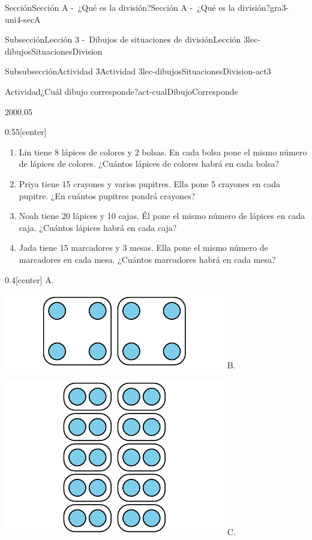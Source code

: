 \documentclass[twoside,10pt,]{article}
\begin{document}
\begin{sectionptx}{Sección}{Sección A -~¿Qué es la división?}{}{Sección A -~¿Qué es la división?}{}{}{gra3-uni4-secA}
\begin{subsectionptx}{Subsección}{Lección 3 -~Dibujos de situaciones de división}{}{Lección 3}{}{}{lec-dibujosSituacionesDivision}
\begin{subsubsectionptx}{Subsubsección}{Actividad 3}{}{Actividad 3}{}{}{lec-dibujosSituacionesDivision-act3}
\begin{activity}{Actividad}{¿Cuál dibujo corresponde?}{act-cualDibujoCorresponde}
\begin{sidebyside}{2}{0}{0}{0.05}
\begin{sbspanel}{0.55}[center]
\begin{enumerate}
\item{}Lin tiene 8 lápices de colores y 2 bolsas. En cada bolsa pone el mismo número de lápices de colores. ¿Cuántos lápices de colores habrá en cada bolsa?%
\item{}Priya tiene 15 crayones y varios pupitres. Ella pone 5 crayones en cada pupitre. ¿En cuántos pupitres pondrá crayones?%
\item{}Noah tiene 20 lápices y 10 cajas. Él pone el mismo número de lápices en cada caja. ¿Cuántos lápices habrá en cada caja?%
\item{}Jada tiene 15 marcadores y 3 mesas. Ella pone el mismo número de marcadores en cada mesa. ¿Cuántos marcadores habrá en cada mesa?%
\end{enumerate}
\end{sbspanel}%
\begin{sbspanel}{0.4}[center]%
A.%
\par
\includegraphics[width=\linewidth]{external/svg-source/tikz-file-149313.pdf}
B.%
\par
\includegraphics[width=\linewidth]{external/svg-source/tikz-file-149314.pdf}
C.%
\par

\end{sbspanel}
\end{sidebyside}
\end{activity}
\end{subsubsectionptx}
\end{subsectionptx}
\end{sectionptx}
\end{document}
